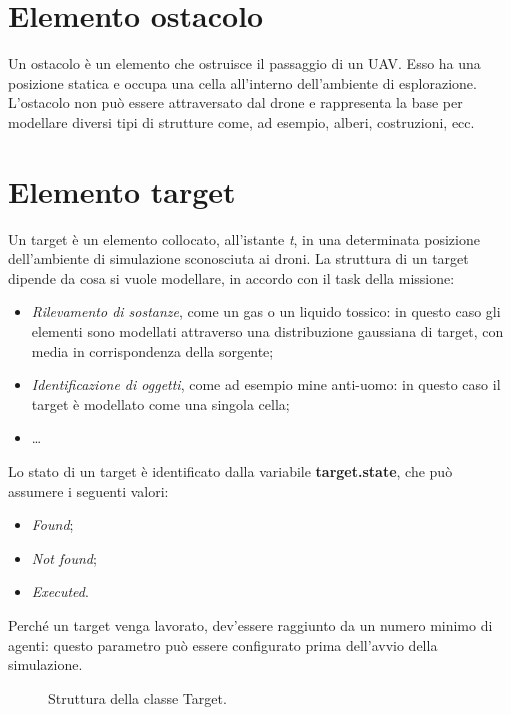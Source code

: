 \section{Elemento ostacolo}

Un ostacolo è un elemento che ostruisce il passaggio di un UAV. 
Esso ha una posizione statica e occupa una cella all’interno dell’ambiente di esplorazione. 
L’ostacolo non può essere attraversato dal drone e rappresenta la base per modellare diversi tipi di strutture come, ad esempio, alberi, costruzioni, ecc.

\section {Elemento target} \label{elemento_target}

Un target è un elemento collocato, all'istante \textit{t}, in una determinata posizione dell’ambiente di simulazione sconosciuta ai droni. 
La struttura di un target dipende da cosa si vuole modellare, in accordo con il task della missione:

\begin{itemize}
    \item \textit{Rilevamento di sostanze}, come un gas o un liquido tossico: in questo caso gli elementi sono modellati attraverso una distribuzione gaussiana di target, con media in corrispondenza della sorgente;
    \item \textit{Identificazione di oggetti}, come ad esempio mine anti-uomo: in questo caso il target è modellato come una singola cella;
    \item \dots
\end{itemize}

Lo stato di un target è identificato dalla variabile \textbf{target.state}, che può assumere i seguenti valori:

\begin{itemize}
    \item \textit{Found};
    \item \textit{Not found};
    \item \textit{Executed}.
\end{itemize}

Perché un target venga lavorato, dev'essere raggiunto da un numero minimo di agenti: questo parametro può essere configurato prima dell'avvio della simulazione.

\begin{figure}[H] 
    \captionsetup{justification=centering, margin=2cm, font=footnotesize}
    \begin{center}
    \end{center}
    \caption{Struttura della classe Target.}
    \label{classe_target}
\end{figure}

